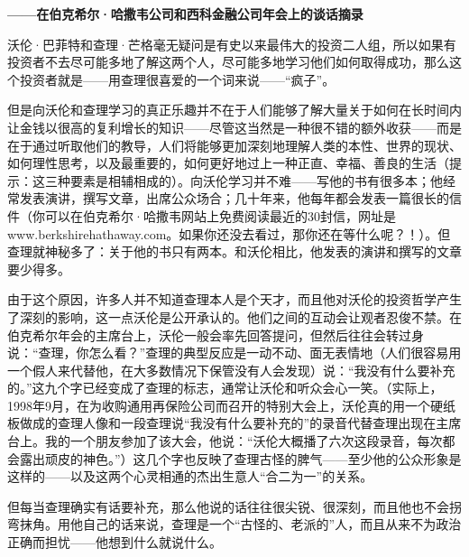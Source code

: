 \renewcommand{\bookchapter}{4}
\cleardoublepage
{}

\vspace{-0.8em}

{\centering \textbf{——在伯克希尔·哈撒韦公司和西科金融公司年会上的谈话摘录}\par}

\vspace{1em}

沃伦·巴菲特和查理·芒格毫无疑问是有史以来最伟大的投资二人组，所以如果有投资者不去尽可能多地了解这两个人，尽可能多地学习他们如何取得成功，那么这个投资者就是——用查理很喜爱的一个词来说——“疯子”。
\par

但是向沃伦和查理学习的真正乐趣并不在于人们能够了解大量关于如何在长时间内让金钱以很高的复利增长的知识——尽管这当然是一种很不错的额外收获——而是在于通过听取他们的教导，人们将能够更加深刻地理解人类的本性、世界的现状、如何理性思考，以及最重要的，如何更好地过上一种正直、幸福、善良的生活（提示：这三种要素是相辅相成的）。向沃伦学习并不难——写他的书有很多本；他经常发表演讲，撰写文章，出席公众场合；几十年来，他每年都会发表一篇很长的信件（你可以在伯克希尔·哈撒韦网站上免费阅读最近的30封信，网址是www.berkshirehathaway.com。如果你还没去看过，那你还在等什么呢？！）。但查理就神秘多了：关于他的书只有两本。和沃伦相比，他发表的演讲和撰写的文章要少得多。
\par

由于这个原因，许多人并不知道查理本人是个天才，而且他对沃伦的投资哲学产生了深刻的影响，这一点沃伦是公开承认的。他们之间的互动会让观者忍俊不禁。在伯克希尔年会的主席台上，沃伦一般会率先回答提问，但然后往往会转过身说：“查理，你怎么看？”查理的典型反应是一动不动、面无表情地（人们很容易用一个假人来代替他，在大多数情况下保管没有人会发现）说：“我没有什么要补充的。”这九个字已经变成了查理的标志，通常让沃伦和听众会心一笑。（实际上，1998年9月，在为收购通用再保险公司而召开的特别大会上，沃伦真的用一个硬纸板做成的查理人像和一段查理说“我没有什么要补充的”的录音代替查理出现在主席台上。我的一个朋友参加了该大会，他说：“沃伦大概播了六次这段录音，每次都会露出顽皮的神色。”）这几个字也反映了查理古怪的脾气——至少他的公众形象是这样的——以及这两个心灵相通的杰出生意人“合二为一”的关系。
\par

但每当查理确实有话要补充，那么他说的话往往很尖锐、很深刻，而且他也不会拐弯抹角。用他自己的话来说，查理是一个“古怪的、老派的”人，而且从来不为政治正确而担忧——他想到什么就说什么。
\par

